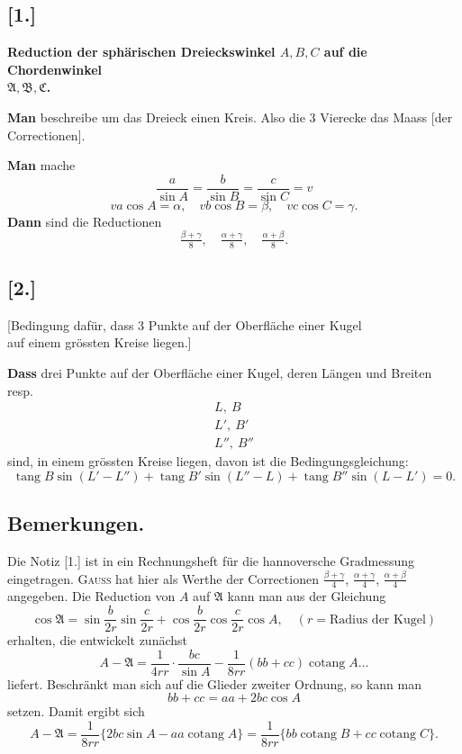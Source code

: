 \documentclass[12pt,a4paper]{article}
\theoremstyle{plain}
\theoremstyle{definition}
\theoremstyle{remark}
\newcommand{\tang}{\operatorname{tang}}
\newcommand{\cotang}{\operatorname{cotang}}
\begin{document}
\subsection*{[1.]}

\begin{center}
\textbf{Reduction der sphärischen Dreieckswinkel $A, B, C$ auf die Chordenwinkel\\$\mathfrak{A}, \mathfrak{B}, \mathfrak{C}$.}
\end{center}

\textbf{Man} beschreibe um das Dreieck einen Kreis.
Also die 3 Vierecke das Maass [der Correctionen].

\textbf{Man} mache
\[
\frac{a}{\sin A} = \frac{b}{\sin B} = \frac{c}{\sin C} = v
\]
\[
va\cos A = \alpha, \quad vb\cos B = \beta, \quad vc\cos C = \gamma.
\]
\textbf{Dann} sind die Reductionen
\[
\tfrac{\beta + \gamma}{8}, \quad \tfrac{\alpha + \gamma}{8}, \quad \tfrac{\alpha + \beta}{8}.
\]

\subsection*{[2.]}

\begin{center}
[Bedingung dafür, dass 3 Punkte auf der Oberfläche einer Kugel\\auf einem grössten Kreise liegen.]
\end{center}

\textbf{Dass} drei Punkte auf der Oberfläche einer Kugel, deren Längen und
Breiten resp.
\[
\begin{array}{c}
L,\ B\\
L',\ B'\\
L'',\ B''
\end{array}
\]
sind, in einem grössten Kreise liegen, davon ist die Bedingungsgleichung:
\[
\tang B \sin(L' - L'') + \tang B' \sin(L'' - L) + \tang B'' \sin(L - L') = 0.
\]

\newpage
\subsection*{Bemerkungen.}

Die Notiz [1.] ist in ein Rechnungsheft für die hannoversche Gradmessung eingetragen. \textsc{Gauss} hat
hier als Werthe der Correctionen $\frac{\beta + \gamma}{4}$, $\frac{\alpha + \gamma}{4}$, $\frac{\alpha + \beta}{4}$ angegeben. Die Reduction von $A$ auf $\mathfrak{A}$ kann man
aus der Gleichung
\[
\cos \mathfrak{A} = \sin\frac{b}{2r}\sin\frac{c}{2r} + \cos\frac{b}{2r}\cos\frac{c}{2r}\cos A, \quad (r = \text{Radius der Kugel})
\]
erhalten, die entwickelt zunächst
\[
A - \mathfrak{A} = \frac{1}{4rr} \cdot \frac{bc}{\sin A} - \frac{1}{8rr}(bb + cc)\cotang A \ldots
\]
liefert. Beschränkt man sich auf die Glieder zweiter Ordnung, so kann man
\[
bb + cc = aa + 2bc\cos A
\]
setzen. Damit ergibt sich
\[
A - \mathfrak{A} = \frac{1}{8rr}\{2bc\sin A - aa\cotang A\} = \frac{1}{8rr}\{bb\cotang B + cc\cotang C\}.
\]
\end{document}
